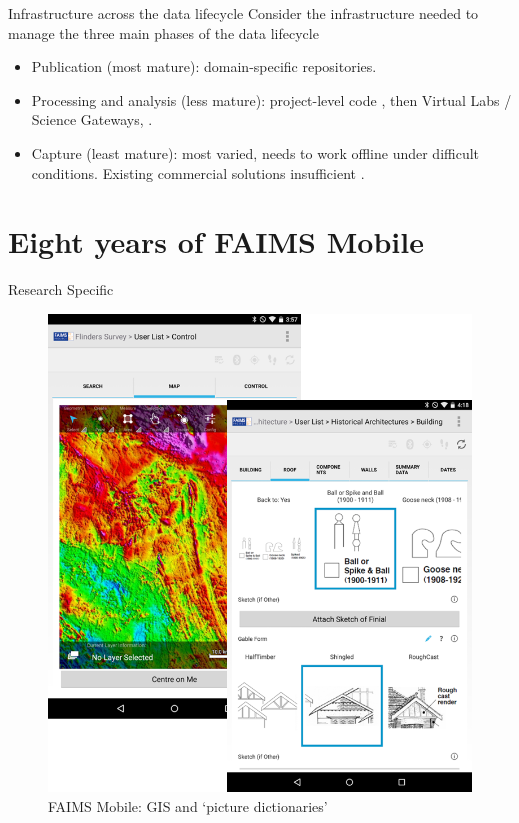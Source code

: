 \documentclass[aspectratio=169, 12pt]{beamer} %
\begin{document}
\begin{frame}{Infrastructure across the data lifecycle}
    Consider the infrastructure needed to manage the three main phases of the data lifecycle
    \begin{itemize}[label=\textbullet]
        \item Publication (most mature): domain-specific repositories.
        \item Processing and analysis (less mature): project-level code \cite{Stewart_Lowndes2017-lj}, then Virtual Labs / Science Gateways, \cite{Alveo2019-tk}.
        \item Capture (least mature): most varied, needs to work offline under difficult conditions. Existing commercial solutions insufficient \cite{Bureau_of_Reclamation2017-xl}.
    \end{itemize}
\end{frame}


\section{Eight years of FAIMS Mobile}

\begin{frame}{Research Specific}
 \begin{figure}[H]
    \centering
        \includegraphics[height=.75\textheight]{figures/FAIMS-screenshots.png}
        \caption{FAIMS Mobile: GIS and `picture dictionaries'}
        \label{fig:FAIMS-mobile-screenshots}
 \end{figure}
\end{frame}
\end{document}
